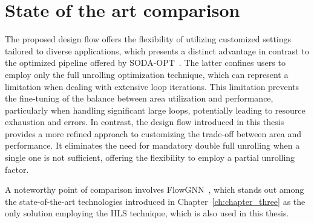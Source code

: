 \section{State of the art comparison}
\label{sec:sota-comparison}%

The proposed design flow offers the flexibility of utilizing customized settings tailored to diverse applications, which presents a distinct advantage in contrast to the optimized pipeline offered by SODA-OPT~\cite{9786533}.
The latter confines users to employ only the full unrolling optimization technique, which can represent a limitation when dealing with extensive loop iterations.
This limitation prevents the fine-tuning of the balance between area utilization and performance, particularly when handling significant large loops, potentially leading to resource exhaustion and errors.
In contrast, the design flow introduced in this thesis provides a more refined approach to customizing the trade-off between area and performance.
It eliminates the need for mandatory double full unrolling when a single one is not sufficient, offering the flexibility to employ a partial unrolling factor.


A noteworthy point of comparison involves FlowGNN~\cite{sarkar2022flowgnn}, which stands out among the state-of-the-art technologies introduced in Chapter~\ref{ch:chapter_three} as the only solution employing the HLS technique, which is also used in this thesis.
